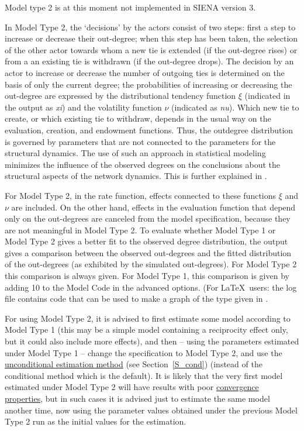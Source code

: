 \documentclass[a4paper,fleqn,11pt]{article}
\newcommand{\+}{\, + \,}
\newcommand{\SI}{{\sf SIENA }}
\begin{document}
{Model type 2 is at this moment not implemented in \SI version 3.
\medskip
\fi

\iffalse
In Model Type 2, the `decisions' by the actors
consist of two steps: first a step to increase or decrease their
out-degree; when this step has been taken, the selection of the
other actor towards whom a new tie is extended (if the out-degree
rises) or from a an existing tie is withdrawn (if the out-degree
drops).
The decision by an actor to increase or decrease the number of outgoing ties
is determined on the basis
of only the current degree; the probabilities of increasing or
decreasing the out-degree are expressed by the distributional
tendency function $\xi$ (indicated in the output as \emph{xi}) and
the volatility function $\nu$ (indicated as \emph{nu}). Which new
tie to create, or which existing tie to withdraw, depends in the
usual way on the evaluation, creation, and endowment functions. Thus, the
outdegree distribution is governed by parameters that are not
connected to the parameters for the structural dynamics. The use of
such an approach in statistical modeling minimizes the influence of
the observed degrees on the conclusions about the structural aspects
of the network dynamics. This is further explained in \citet{Snijders03}.

For Model Type 2, in the rate function, effects connected to these
functions $\xi$ and $\nu$ are included. On the other hand, effects
in the evaluation function that depend only on the out-degrees are
canceled from the model specification, because they are not
meaningful in Model Type 2. To evaluate whether Model Type 1 or
Model Type 2 gives a better fit to the observed degree distribution,
the output gives a comparison between the observed out-degrees and
the fitted distribution of the out-degrees (as exhibited by the
simulated out-degrees). For Model Type 2 this comparison is always
given. For Model Type 1, this comparison is given by adding 10 to the
Model Code in the advanced options. (For \LaTeX\ users: the log
file contains code that can be used to make a graph of the type
given in \citet{Snijders03}.

For using Model Type 2, it is advised to first estimate some model
according to Model Type 1 (this may be a simple model containing a
reciprocity effect only, but it could also include more effects),
and then -- using the parameters estimated under Model Type 1 --
change the specification to Model Type 2, and use the
\hyperlink{T_S_cond}{unconditional estimation method}
(see Section~\ref{S_cond}) (instead of the conditional method which is the
default). It is likely that the very first model estimated under
Model Type 2 will have results with poor
\hyperlink{T_convergence}{convergence properties}, but in such
cases it is advised just to estimate the same model another time,
now using the parameter values obtained under the previous Model
Type 2 run as the initial values for the estimation.

}
\end{document}
